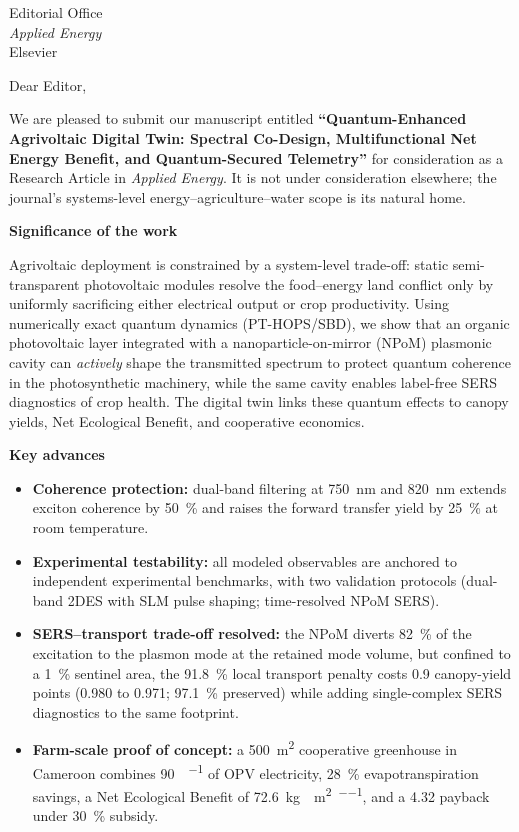 \documentclass[10pt]{letter}
\begin{document}
\sloppy

\begin{letter}{Editorial Office\\
\textit{Applied Energy}\\
Elsevier}

\opening{Dear Editor,}
\enlargethispage{2\baselineskip}

We are pleased to submit our manuscript entitled \textbf{``Quantum-Enhanced Agrivoltaic Digital Twin: Spectral Co-Design, Multifunctional Net Energy Benefit, and Quantum-Secured Telemetry''} for consideration as a Research Article in \textit{Applied Energy}. It is not under consideration elsewhere; the journal's systems-level energy--agriculture--water scope is its natural home.

\noindent\textbf{Significance of the work}

Agrivoltaic deployment is constrained by a system-level trade-off: static semi-transparent photovoltaic modules resolve the food--energy land conflict only by uniformly sacrificing either electrical output or crop productivity. Using numerically exact quantum dynamics (PT-HOPS/SBD), we show that an organic photovoltaic layer integrated with a nanoparticle-on-mirror (NPoM) plasmonic cavity can \emph{actively} shape the transmitted spectrum to protect quantum coherence in the photosynthetic machinery, while the same cavity enables label-free SERS diagnostics of crop health. The digital twin links these quantum effects to canopy yields, Net Ecological Benefit, and cooperative economics.

\noindent\textbf{Key advances}

\begin{itemize}
\item \textbf{Coherence protection:} dual-band filtering at \qty{750}{\nm} and \qty{820}{\nm} extends exciton coherence by \qty{50}{\percent} and raises the forward transfer yield by \qty{25}{\percent} at room temperature.
\item \textbf{Experimental testability:} all modeled observables are anchored to independent experimental benchmarks, with two validation protocols (dual-band 2DES with SLM pulse shaping; time-resolved NPoM SERS).
\item \textbf{SERS--transport trade-off resolved:} the NPoM diverts \qty{82}{\percent} of the excitation to the plasmon mode at the retained mode volume, but confined to a \qty{1}{\percent} sentinel area, the \qty{91.8}{\percent} local transport penalty costs 0.9 canopy-yield points (\num{0.980} to \num{0.971}; \qty{97.1}{\percent} preserved) while adding single-complex SERS diagnostics to the same footprint.
\item \textbf{Farm-scale proof of concept:} a \qty{500}{\m\squared} cooperative greenhouse in Cameroon combines \qty{90}{\MWh\per\yr} of OPV electricity, \qty{28}{\percent} evapotranspiration savings, a Net Ecological Benefit of \qty{72.6}{\kg{}\per\m\squared\per\yr}, and a \qty{4.32}{\yr} payback under \qty{30}{\percent} subsidy.
\end{itemize}


\end{letter}
\end{document}
